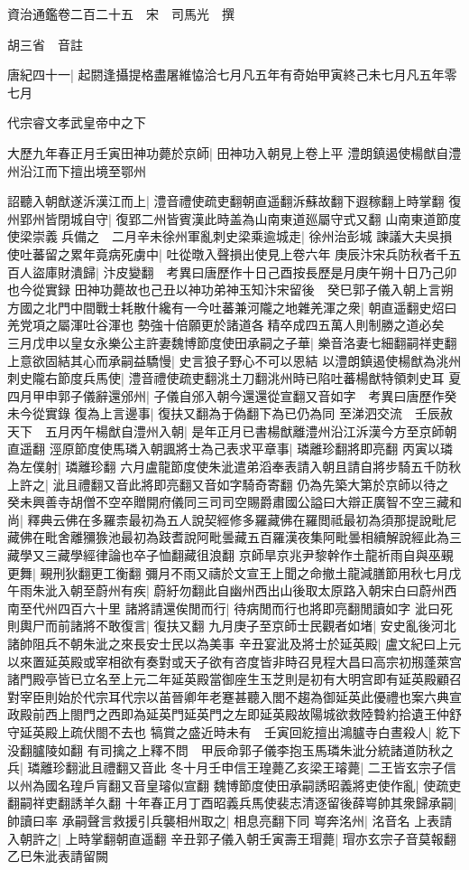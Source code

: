 資治通鑑卷二百二十五　宋　司馬光　撰

胡三省　音註

唐紀四十一|{
	起閼逢攝提格盡屠維恊洽七月凡五年有奇始甲寅終己未七月凡五年零七月}


代宗睿文孝武皇帝中之下

大歷九年春正月壬寅田神功薨於京師|{
	田神功入朝見上卷上平}
澧朗鎮遏使楊猷自澧州沿江而下擅出境至鄂州

詔聽入朝猷遂泝漢江而上|{
	澧音禮使疏吏翻朝直遥翻泝蘇故翻下遐稼翻上時掌翻}
復州郢州皆閉城自守|{
	復郢二州皆賓漢此時盖為山南東道廵屬守式又翻}
山南東道節度使梁崇義兵備之　二月辛未徐州軍亂刺史梁乘逾城走|{
	徐州治彭城}
諫議大夫吳損使吐蕃留之累年竟病死虜中|{
	吐從暾入聲損出使見上卷六年}
庚辰汴宋兵防秋者千五百人盜庫財潰歸|{
	汴皮變翻　考異曰唐歷作十日己酉按長歷是月庚午朔十日乃己卯也今從實録}
田神功薨故也己丑以神功弟神玉知汴宋留後　癸巳郭子儀入朝上言朔方國之北門中間戰士耗散什纔有一今吐蕃兼河隴之地雜羌渾之衆|{
	朝直遥翻史炤曰羌党項之屬渾吐谷渾也}
勢強十倍願更於諸道各精卒成四五萬人則制勝之道必矣　三月戊申以皇女永樂公主許妻魏博節度使田承嗣之子華|{
	樂音洛妻七細翻嗣祥吏翻}
上意欲固結其心而承嗣益驕慢|{
	史言狼子野心不可以恩結}
以澧朗鎮遏使楊猷為洮州刺史隴右節度兵馬使|{
	澧音禮使疏吏翻洮土刀翻洮州時已陷吐蕃楊猷特領刺史耳}
夏四月甲申郭子儀辭還邠州|{
	子儀自邠入朝今還還從宣翻又音如字　考異曰唐歷作癸未今從實錄}
復為上言邊事|{
	復扶又翻為于偽翻下為已仍為同}
至涕泗交流　壬辰赦天下　五月丙午楊猷自澧州入朝|{
	是年正月已書楊猷離澧州沿江泝漢今方至京師朝直遥翻}
涇原節度使馬璘入朝諷將士為己表求平章事|{
	璘離珍翻將即亮翻}
丙寅以璘為左僕射|{
	璘離珍翻}
六月盧龍節度使朱泚遣弟滔奉表請入朝且請自將步騎五千防秋上許之|{
	泚且禮翻又音此將即亮翻又音如字騎奇寄翻}
仍為先築大第於京師以待之　癸未興善寺胡僧不空卒贈開府儀同三司司空賜爵肅國公謚曰大辯正廣智不空三藏和尚|{
	釋典云佛在多羅柰最初為五人說契經修多羅藏佛在羅閲祗最初為須那提說毗尼藏佛在毗舍離獼㺅池最初為跂耆說阿毗曇藏五百羅漢夜集阿毗曇相續解說經此為三藏學又三藏學經律論也卒子恤翻藏徂浪翻}
京師旱京兆尹黎幹作土龍祈雨自與巫覡更舞|{
	覡刑狄翻更工衡翻}
彌月不雨又禱於文宣王上聞之命撤土龍減膳節用秋七月戊午雨朱泚入朝至蔚州有疾|{
	蔚紆勿翻此自幽州西出山後取太原路入朝宋白曰蔚州西南至代州四百六十里}
諸將請還俟閒而行|{
	待病閒而行也將即亮翻閒讀如字}
泚曰死則輿尸而前諸將不敢復言|{
	復扶又翻}
九月庚子至京師士民觀者如堵|{
	安史亂後河北諸帥阻兵不朝朱泚之來長安士民以為美事}
辛丑宴泚及將士於延英殿|{
	盧文紀曰上元以來置延英殿或宰相欲有奏對或天子欲有咨度皆非時召見程大昌曰高宗初剏蓬萊宫諸門殿亭皆已立名至上元二年延英殿當御座生玉芝則是初有大明宫即有延英殿顧召對宰臣則始於代宗耳代宗以苖晉卿年老蹇甚聽入閭不趨為御延英此優禮也案六典宣政殿前西上閤門之西即為延英門延英門之左即延英殿故陽城欲救陸䞇約拾遺王仲舒守延英殿上疏伏閤不去也}
犒賞之盛近時未有　壬寅回紇擅出鴻臚寺白晝殺人|{
	紇下没翻臚陵如翻}
有司擒之上釋不問　甲辰命郭子儀李抱玉馬璘朱泚分統諸道防秋之兵|{
	璘離珍翻泚且禮翻又音此}
冬十月壬申信王瑝薨乙亥梁王璿薨|{
	二王皆玄宗子信以州為國名瑝戶肓翻又音皇璿似宣翻}
魏博節度使田承嗣誘昭義將吏使作亂|{
	使疏吏翻嗣祥吏翻誘羊久翻}
十年春正月丁酉昭義兵馬使裴志清逐留後薛㟧帥其衆歸承嗣|{
	帥讀曰率}
承嗣聲言救援引兵襲相州取之|{
	相息亮翻下同}
㟧奔洺州|{
	洺音名}
上表請入朝許之|{
	上時掌翻朝直遥翻}
辛丑郭子儀入朝壬寅壽王瑁薨|{
	瑁亦玄宗子音莫報翻}
乙巳朱泚表請留闕

